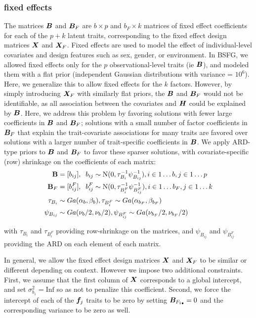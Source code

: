 \documentclass[11pt]{amsart}
\newcommand*{\B}[1]{\ifmmode\bm{#1}\else\textbf{#1}\fi}
\begin{document}
\subsubsection{fixed effects}
The matrices $\B{B}$ and $\B{B}_F$ are $b \times p$ and $b_F \times k$ matrices of fixed effect coefficients for each of the $p + k$ latent traits, corresponding to the fixed effect design matrices $\B{X}$ and $\B{X}_F$. Fixed effects are used to model the effect of individual-level covariates and design features such as sex, gender, or environment. In BSFG, we allowed fixed effects only for the $p$ observational-level traits (ie $\B{B}$), and modeled them with a flat prior (independent Gaussian distributions with variance = $10^6$). Here, we generalize this to allow fixed effects for the $k$ factors. However, by simply introducing $\B{X}_F$ with similarly flat priors, the $\B{B}$ and $\B{B}_F$ would not be identifiable, as all association between the covariates and $\B{H}$ could be explained by $\B{B}$. Here, we address this problem by favoring solutions with fewer large coefficients in $\B{B}$ and $\B{B}_F$; solutions with a small number of factor coefficients in $\B{B}_F$ that explain the trait-covariate associations for many traits are favored over solutions with a larger number of trait-specific coefficients in $\B{B}$. We apply ARD-type priors to $\B{B}$ and $\B{B}_F$ to favor these sparser solutions, with covariate-specific (row) shrinkage on the coefficients of each matrix:
\begin{align}\begin{split}
\B{B} &= [b_{ij}],\;\; b_{ij} \sim \mbox{N}(0,\tau^{-1}_{B_i} \psi^{-1}_{B_{ij}}), i \in 1\dots b, j \in 1\dots p \\
\B{B}_F &= [b^F_{ij}],\;\; b^F_{ij} \sim \mbox{N}(0,\tau^{-1}_{B^F_i} \psi^{-1}_{B^F_{ij}}), i \in 1\dots b_F, j \in 1\dots k\\
\tau_{B_i} &\sim Ga(\alpha_b, \beta_b), \tau_{B^F_i} \sim Ga(\alpha_{b_F}, \beta_{b_F}) \\
\psi_{B_{ij}} &\sim Ga(\nu_b/2, \nu_b/2), \psi_{B^F_{ij}} \sim Ga(\nu_{b_F}/2, \nu_{b_F}/2)
\end{split} \end{align}

\noindent with $\tau_{B_i}$ and $\tau_{B^F_i}$ providing row-shrinkage on the matrices, and $\psi_{B_{ij}}$ and $\psi_{B^F_{ij}}$ providing the ARD on each element of each matrix.

In general, we allow the fixed effect design matrices $\B{X}$ and $\B{X}_F$ to be similar or different depending on context. 
However we impose two additional constraints. First, we assume that the first column of $\B{X}$ corresponds to a global intercept, and set $\sigma^2_{b_1} = \mbox{Inf}$ so as not to penalize this coefficient. 
Second, we force the intercept of each of the $\B{f}_j$ traits to be zero by setting $\B{B}_{F_{1\bullet}} = 0$ and the corresponding variance to be zero as well.
\end{document}
